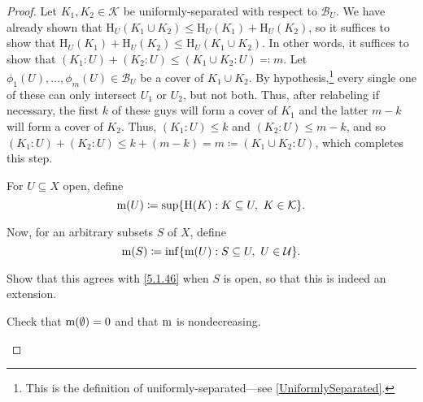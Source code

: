 \begin{thm}
\begin{proof}
\label{Haar.8}
Let $K_1,K_2\in \mathcal{K}$ be uniformly-separated with respect to $\mathcal{B}_U$.  We have already shown that $\mathrm{H}_U(K_1\cup K_2)\leq \mathrm{H}_U(K_1)+\mathrm{H}_U(K_2)$, so it suffices to show that $\mathrm{H}_U(K_1)+\mathrm{H}_U(K_2)\leq \mathrm{H}_U(K_1\cup K_2)$.  In other words, it suffices to show that $(K_1:U)+(K_2:U)\leq (K_1\cup K_2:U)\eqqcolon m$.  Let $\phi _1(U),\ldots ,\phi _m(U)\in \mathcal{B}_U$ be a cover of $K_1\cup K_2$.  By hypothesis,\footnote{This is the definition of uniformly-separated---see \cref{UniformlySeparated}.} every single one of these can only intersect $U_1$ or $U_2$, but not both.  Thus, after relabeling if necessary, the first $k$ of these guys will form a cover of $K_1$ and the latter $m-k$ will form a cover of $K_2$.  Thus, $(K_1:U)\leq k$ and $(K_2:U)\leq m-k$, and so $(K_1:U)+(K_2:U)\leq k+(m-k)=m\coloneqq (K_1\cup K_2:U)$, which completes this step.

For $U\subseteq X$ open, define
\begin{equation}\label{5.1.46}
\mathrm{m} (U)\coloneqq \sup \{ \mathrm{H}(K):K\subseteq U,\ K\in \mathcal{K}\} .
\end{equation}

Now, for an arbitrary subsets $S$ of $X$, define
\begin{equation}\label{5.1.38}
\mathrm{m} (S)\coloneqq \inf \{ \mathrm{m} (U):S\subseteq U,\ U\in \mathcal{U}\} .
\end{equation}
\begin{exr}
Show that this agrees with \eqref{5.1.46} when $S$ is open, so that this is indeed an extension.
\end{exr}

\begin{exr}
Check that $\mathrm{m} (\emptyset )=0$ and that $\mathrm{m}$ is nondecreasing.
\end{exr}


\end{proof}
\end{thm}
